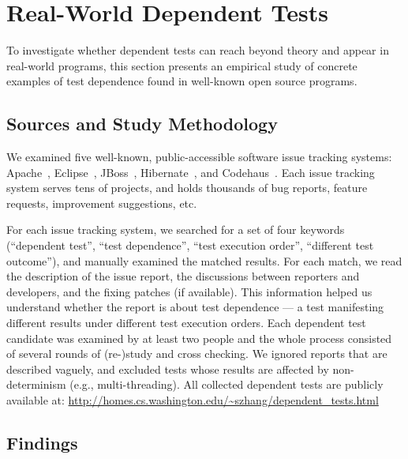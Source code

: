 \section{Real-World Dependent Tests}
\label{sec:study}

\newcommand{\unum}{{{14}}\xspace}
\newcommand{\svratio}{{{61}}}
\newcommand{\svnum}{{{59}}\xspace}
\newcommand{\unfixed}{{{58}}\xspace}


To investigate whether dependent tests can reach beyond theory
and appear in real-world programs, this section presents an empirical
study of concrete examples of test dependence found in
well-known open source programs. 


\subsection{Sources and Study Methodology}

We examined five well-known, public-accessible software issue
tracking systems: Apache~\cite{apachebug},
Eclipse~\cite{eclipsebug}, JBoss~\cite{jbossbug},
Hibernate~\cite{hibernatebug}, and Codehaus~\cite{codehausbug}.
Each issue tracking system serves tens of projects, and
holds thousands of bug reports, feature requests, improvement
suggestions, etc.

For each issue tracking system, we searched for a set of four keywords
(``dependent test'', ``test dependence'', ``test execution order'',
``different test outcome''), and manually examined the matched results. For each match, we read the
description of the issue report, the discussions between reporters
and developers, and the fixing patches (if available). This information
helped us understand whether the report is about test dependence
--- a test manifesting different results under different
test execution orders. Each dependent test candidate was examined by
at least two people and the whole process consisted of several
rounds of (re-)study and cross checking. We ignored reports
that are described vaguely, and excluded tests whose results are
affected by non-determinism (e.g., multi-threading).
All collected dependent tests are publicly available 
at: \url{http://homes.cs.washington.edu/~szhang/dependent\_tests.html}


\subsection{Findings}

